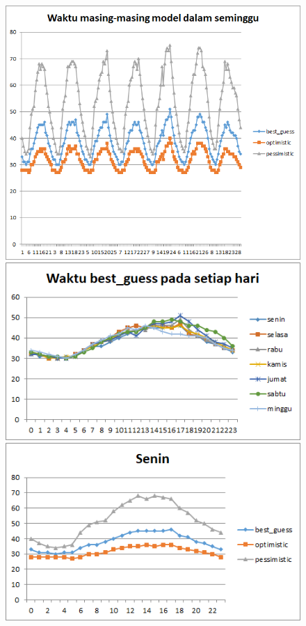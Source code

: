\begin{figure}[H]
				\centering		
				\includegraphics[scale=0.7]{Gambar/waktuallmodelsampel124072017reverse.png}
				\includegraphics[]{Gambar/waktubestguesssampel124072017reverse.png}
				\includegraphics[]{Gambar/seninsampel124072017reverse.png}
\end{figure}
			
